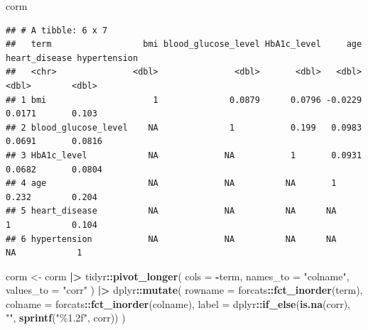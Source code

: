 \documentclass[
]{article}
\newenvironment{Shaded}{\begin{snugshade}}{\end{snugshade}}
\newcommand{\AttributeTok}[1]{\textcolor[rgb]{0.13,0.29,0.53}{#1}}
\newcommand{\FunctionTok}[1]{\textcolor[rgb]{0.13,0.29,0.53}{\textbf{#1}}}
\newcommand{\NormalTok}[1]{#1}
\newcommand{\OtherTok}[1]{\textcolor[rgb]{0.56,0.35,0.01}{#1}}
\newcommand{\SpecialCharTok}[1]{\textcolor[rgb]{0.81,0.36,0.00}{\textbf{#1}}}
\newcommand{\StringTok}[1]{\textcolor[rgb]{0.31,0.60,0.02}{#1}}
\begin{document}
\begin{Shaded}
\begin{Highlighting}[]
\NormalTok{corm}
\end{Highlighting}
\end{Shaded}

\begin{verbatim}
## # A tibble: 6 x 7
##   term                  bmi blood_glucose_level HbA1c_level     age heart_disease hypertension
##   <chr>               <dbl>               <dbl>       <dbl>   <dbl>         <dbl>        <dbl>
## 1 bmi                     1              0.0879      0.0796 -0.0229        0.0171       0.103 
## 2 blood_glucose_level    NA              1           0.199   0.0983        0.0691       0.0816
## 3 HbA1c_level            NA             NA           1       0.0931        0.0682       0.0804
## 4 age                    NA             NA          NA       1             0.232        0.204 
## 5 heart_disease          NA             NA          NA      NA             1            0.104 
## 6 hypertension           NA             NA          NA      NA            NA            1
\end{verbatim}

\begin{Shaded}
\begin{Highlighting}[]
\NormalTok{corm }\OtherTok{\textless{}{-}}\NormalTok{ corm }\SpecialCharTok{|\textgreater{}}
\NormalTok{  tidyr}\SpecialCharTok{::}\FunctionTok{pivot\_longer}\NormalTok{(}
    \AttributeTok{cols =} \SpecialCharTok{{-}}\NormalTok{term,}
    \AttributeTok{names\_to =} \StringTok{"colname"}\NormalTok{,}
    \AttributeTok{values\_to =} \StringTok{"corr"}
\NormalTok{  ) }\SpecialCharTok{|\textgreater{}}
\NormalTok{  dplyr}\SpecialCharTok{::}\FunctionTok{mutate}\NormalTok{(}
    \AttributeTok{rowname =}\NormalTok{ forcats}\SpecialCharTok{::}\FunctionTok{fct\_inorder}\NormalTok{(term),}
    \AttributeTok{colname =}\NormalTok{ forcats}\SpecialCharTok{::}\FunctionTok{fct\_inorder}\NormalTok{(colname),}
    \AttributeTok{label =}\NormalTok{ dplyr}\SpecialCharTok{::}\FunctionTok{if\_else}\NormalTok{(}\FunctionTok{is.na}\NormalTok{(corr), }\StringTok{""}\NormalTok{, }\FunctionTok{sprintf}\NormalTok{(}\StringTok{"\%1.2f"}\NormalTok{, corr))}
\NormalTok{  )}
\end{Highlighting}
\end{Shaded}
\end{document}

